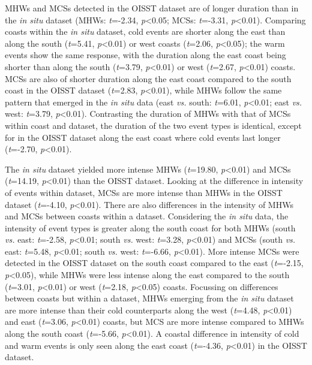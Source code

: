 \documentclass[a4paper,10pt,review]{elsarticle}
\begin{document}
MHWs and MCSs detected in the OISST dataset are of longer duration than in the \emph{in situ} dataset (MHWs: \emph{t}=-2.34, \emph{p}<0.05; MCSs: \emph{t}=-3.31, \emph{p}<0.01). Comparing coasts within the \emph{in situ} dataset, cold events are shorter along the east than along the south (\emph{t}=5.41, \emph{p}<0.01) or west coasts (\emph{t}=2.06, \emph{p}<0.05); the warm events show the same response, with the duration along the east coast being shorter than along the south (\emph{t}=3.79, \emph{p}<0.01) or west (\emph{t}=2.67, \emph{p}<0.01) coasts. MCSs are also of shorter duration along the east coast compared to the south coast in the OISST dataset (\emph{t}=2.83, \emph{p}<0.01), while MHWs follow the same pattern that emerged in the \emph{in situ} data (east \emph{vs.} south: \emph{t}=6.01, \emph{p}<0.01; east \emph{vs.} west: \emph{t}=3.79, \emph{p}<0.01). Contrasting the duration of MHWs with that of MCSs within coast and dataset, the duration of the two event types is identical, except for in the OISST dataset along the east coast where cold events last longer (\emph{t}=-2.70, \emph{p}<0.01).

The \emph{in situ} dataset yielded more intense MHWs (\emph{t}=19.80, \emph{p}<0.01) and MCSs (\emph{t}=14.19, \emph{p}<0.01) than the OISST dataset. Looking at the difference in intensity of events within dataset, MCSs are more intense than MHWs in the OISST dataset (\emph{t}=-4.10, \emph{p}<0.01). There are also differences in the intensity of MHWs and MCSs between coasts within a dataset. Considering the \emph{in situ} data, the intensity of event types is greater along the south coast for both MHWs (south \emph{vs.} east: \emph{t}=-2.58, \emph{p}<0.01; south \emph{vs.} west: \emph{t}=3.28, \emph{p}<0.01) and MCSs (south \emph{vs.} east: \emph{t}=5.48, \emph{p}<0.01; south \emph{vs.} west: \emph{t}=-6.66, \emph{p}<0.01). More intense MCSs were detected in the OISST dataset on the south coast compared to the east (\emph{t}=-2.15, \emph{p}<0.05), while MHWs were less intense along the east compared to the south (\emph{t}=3.01, \emph{p}<0.01) or west (\emph{t}=2.18, \emph{p}<0.05) coasts. Focussing on differences between coasts but within a dataset, MHWs emerging from the \emph{in situ} dataset are more intense than their cold counterparts along the west (\emph{t}=4.48, \emph{p}<0.01) and east (\emph{t}=3.06, \emph{p}<0.01) coasts, but MCS are more intense compared to MHWs along the south coast (\emph{t}=-5.66, \emph{p}<0.01). A coastal difference in intensity of cold and warm events is only seen along the east coast (\emph{t}=-4.36, \emph{p}<0.01) in the OISST dataset.
\end{document}
